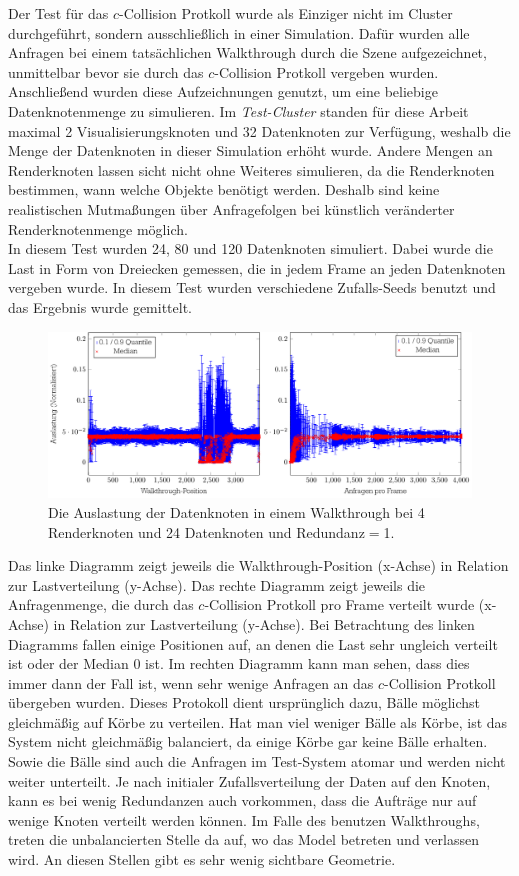 Der Test für das $c$-Collision Protkoll wurde als Einziger nicht im Cluster durchgeführt, sondern ausschließlich in einer Simulation. Dafür wurden alle Anfragen bei einem tatsächlichen Walkthrough durch die Szene aufgezeichnet, unmittelbar bevor sie durch das $c$-Collision Protkoll vergeben wurden. Anschließend wurden diese Aufzeichnungen genutzt, um eine beliebige Datenknotenmenge zu simulieren. Im \textit{Test-Cluster} standen für diese Arbeit maximal 2 Visualisierungsknoten und 32 Datenknoten zur Verfügung, weshalb die Menge der Datenknoten in dieser Simulation erhöht wurde. Andere Mengen an Renderknoten lassen sicht nicht ohne Weiteres simulieren, da die Renderknoten bestimmen, wann welche Objekte benötigt werden. Deshalb sind keine realistischen Mutmaßungen über Anfragefolgen bei künstlich veränderter Renderknotenmenge möglich.\\
In diesem Test wurden 24, 80 und 120 Datenknoten simuliert. Dabei wurde die Last in Form von Dreiecken gemessen, die in jedem Frame an jeden Datenknoten vergeben wurde. In diesem Test wurden verschiedene Zufalls-Seeds benutzt und das Ergebnis wurde gemittelt.\\
\begin{figure}
\centering
\includegraphics[scale=0.75]{images/diag_cCol_red1_render4_data24_2x.pdf}
  \caption{\label{fig:eval:cCol1}Die Auslastung der Datenknoten in einem Walkthrough bei 4 Renderknoten und 24 Datenknoten und Redundanz$=$1.}
\end{figure}
Das linke Diagramm zeigt jeweils die Walkthrough-Position (x-Achse) in Relation zur Lastverteilung (y-Achse). Das rechte Diagramm zeigt jeweils die Anfragenmenge, die durch das $c$-Collision Protkoll pro Frame verteilt wurde (x-Achse) in Relation zur Lastverteilung (y-Achse). Bei Betrachtung des linken Diagramms fallen einige Positionen auf, an denen die Last sehr ungleich verteilt ist oder der Median 0 ist. Im rechten Diagramm kann man sehen, dass dies immer dann der Fall ist, wenn sehr wenige Anfragen an das $c$-Collision Protkoll übergeben wurden. Dieses Protokoll dient ursprünglich dazu, Bälle möglichst gleichmäßig auf Körbe zu verteilen. Hat man viel weniger Bälle als Körbe, ist das System nicht gleichmäßig balanciert, da einige Körbe gar keine Bälle erhalten. Sowie die Bälle sind auch die Anfragen im Test-System atomar und werden nicht weiter unterteilt. Je nach initialer Zufallsverteilung der Daten auf den Knoten, kann es bei wenig Redundanzen auch vorkommen, dass die Aufträge nur auf wenige Knoten verteilt werden können. Im Falle des benutzen Walkthroughs, treten die unbalancierten Stelle da auf, wo das Model betreten und verlassen wird. An diesen Stellen gibt es sehr wenig sichtbare Geometrie.\\
